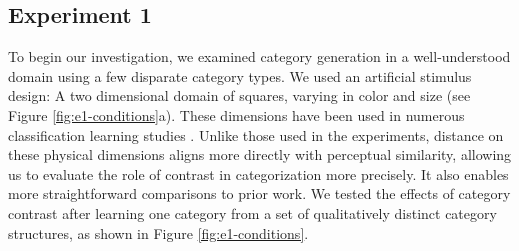 \documentclass[12pt]{article}
\begin{document}
\begin{flushleft}
%
%

\section{Experiment 1}
To begin our investigation, we examined category generation in a well-understood domain using a few disparate category types. We used an
artificial stimulus design: A two dimensional domain of squares, varying in
color and size (see Figure \ref{fig:e1-conditions}a). These dimensions
have been used in numerous classification learning studies
\cite[e.g.,][]{conaway2016similar,conaway2016generalization,shepard1961learning,nosofsky1994comparing}.
Unlike those used in the \cite{jern2013probabilistic} experiments, distance on
these physical dimensions aligns more directly with perceptual similarity,
allowing us to evaluate the role of  contrast in categorization
more precisely. It also enables more straightforward comparisons to prior work. We tested the effects of category contrast after learning one category from a set of qualitatively distinct category structures, as shown in Figure \ref{fig:e1-conditions}.


\end{flushleft}
\end{document}
